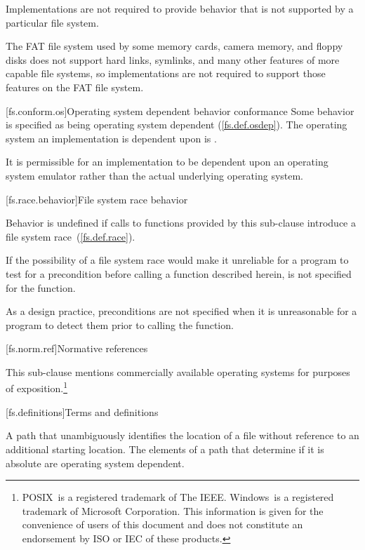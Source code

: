 \pnum
Implementations are not required to provide behavior that is not supported by
a particular file system.
\begin{example} The FAT file system used by some memory cards, camera memory, and
floppy disks does not support hard links, symlinks, and many other features of
more capable file systems, so implementations are not required to support those
features on the FAT file system. \end{example}

[fs.conform.os]{Operating system dependent behavior conformance}
\pnum
Some behavior is specified as being
operating system dependent (\ref{fs.def.osdep}). The operating system an
implementation is dependent upon is
.

\pnum
It is permissible for an implementation to be dependent upon an operating
system emulator rather than the actual underlying operating system.

[fs.race.behavior]{File system race behavior}

\pnum
Behavior is undefined if calls to functions provided by this sub-clause introduce a file system race~(\ref{fs.def.race}).

\pnum
If the possibility of a file system race would make it unreliable for a
program to test for a precondition before calling a function described herein,
\requires is not specified for the function.
\begin{note} As a design practice, preconditions are not specified when it
is unreasonable for a program to detect them prior to calling the function.
\end{note}

[fs.norm.ref]{Normative references}

\pnum
This sub-clause mentions commercially
available operating systems for purposes of exposition.\footnote{
POSIX\textregistered\ is a registered trademark of The IEEE.
Windows\textregistered\ is a registered trademark of Microsoft Corporation.
This information is given for the convenience of users of this document and
does not constitute an endorsement by ISO or IEC of these
products.
}

[fs.definitions]{Terms and definitions}

A path that unambiguously
identifies the location of a file without reference to an additional starting
location. The elements of a path that determine if it is absolute are
operating system dependent.

